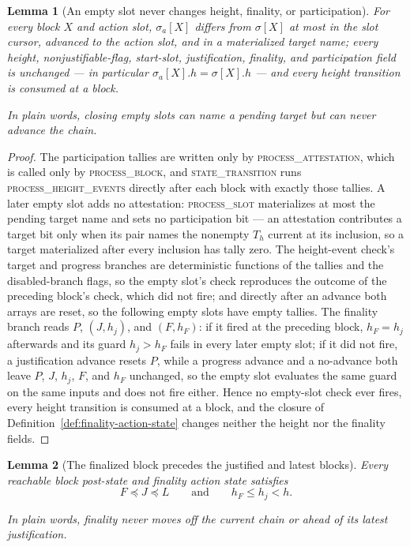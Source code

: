 \ifx\litemode\undefined\documentclass{article}\fi
\theoremstyle{plain}
\newtheorem{lemma}{Lemma}
\theoremstyle{definition}
\theoremstyle{remark}
\begin{document}
\begin{lemma}[An empty slot never changes height, finality, or participation]
\label{lem:empty-slot-noop}
For every block \(X\) and action slot, \(\sigma_a[X]\) differs from
\(\sigma[X]\) at most in the slot cursor, advanced to the action slot,
and in a materialized target name; every height, nonjustifiable-flag,
start-slot, justification, finality, and participation field is
unchanged --- in particular
\(\sigma_a[X].h=\sigma[X].h\) --- and every height transition is consumed
at a block.

In plain words, closing empty slots can name a pending target but can
never advance the chain.
\end{lemma}

\begin{proof}
The participation tallies are written only by
\textsc{process\_attestation}, which is called only by
\textsc{process\_block}, and \textsc{state\_transition} runs
\textsc{process\_height\_events} directly after each block with exactly
those tallies.  A later empty slot adds no attestation:
\textsc{process\_slot} materializes at most the pending target name and
sets no participation bit --- an attestation contributes a target bit
only when its pair names the nonempty \(T_h\) current at its inclusion,
so a target materialized after every inclusion has tally zero.  The
height-event check's target and progress branches are deterministic
functions of the tallies and the disabled-branch flags, so the empty
slot's check reproduces the outcome
of the preceding block's check, which did not fire; and directly after an
advance both arrays are reset, so the following empty slots have empty
tallies.  The finality branch reads \(P\), \((J,h_j)\), and
\((F,h_F)\): if it fired at the preceding block, \(h_F=h_j\) afterwards
and its guard \(h_j>h_F\) fails in every later empty slot; if it did
not fire, a justification advance resets \(P\), while a progress
advance and a no-advance both leave \(P\), \(J\), \(h_j\), \(F\), and
\(h_F\) unchanged, so the empty slot evaluates the same guard on the
same inputs and does not fire either.  Hence no empty-slot check ever fires, every height transition
is consumed at a block, and the closure of
Definition~\ref{def:finality-action-state} changes neither the height
nor the finality fields.
\end{proof}

\begin{lemma}[The finalized block precedes the justified and latest blocks]
\label{lem:finalized-before-justified}
Every reachable block post-state and finality action state satisfies
\[
  F\preceq J\preceq L
  \qquad\text{and}\qquad
  h_F\leq h_j<h.
\]

In plain words, finality never moves off the current chain or ahead of its
latest justification.
\end{lemma}
\end{document}
